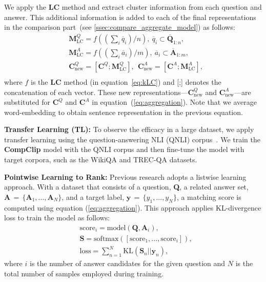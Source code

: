 \documentclass[sigconf]{acmart}
\begin{document}
We apply the \textbf{LC} method and extract cluster information from each question and answer. This additional information is added to each of the final representations in the comparison part~(see \ref{ssec:compare_aggregate_model}) as follows:
\begin{equation}
\begin{aligned}
& \textbf{M}_{\text{LC}}^Q=f(({\scriptstyle\sum_i}\overline{q}_i)/n),~\overline{q}_i\subset{\overline{\textbf{Q}}_{1:n}}, \\
& \textbf{M}_{\text{LC}}^A=f(({\scriptstyle\sum_i}\overline{a}_i)/m),~\overline{a}_i\subset{\overline{\textbf{A}}_{1:m}}, \\
& \textbf{C}^Q_{\text{new}}= [\textbf{C}^Q;\textbf{M}_{\text{LC}}^Q],~~\textbf{C}^A_{\text{new}}= [\textbf{C}^A;\textbf{M}_{\text{LC}}^A], \\
\end{aligned}
\label{eq:lc}
\end{equation}
where $f$ is the \textbf{LC} method (in equation~\ref{eq:kLC}) and [;] denotes the concatenation of each vector.
These new representations—$\textbf{C}^Q_{\text{new}}$ and $\textbf{C}^A_{\text{new}}$—are substituted for $\textbf{C}^Q$ and $\textbf{C}^A$ in equation~(\ref{eq:aggregation}).
Note that we average word-embedding to obtain sentence representation in the previous equation.


\vspace*{2mm}
\noindent\textbf{Transfer Learning (TL): }
To observe the efficacy in a large dataset, we apply transfer learning using the question-answering NLI (QNLI) corpus~\cite{wang2018glue}.
We train the \textbf{CompClip} model with the QNLI corpus and then fine-tune the model with target corpora, such as the WikiQA and TREC-QA datasets.

\vspace*{2mm}
\noindent\textbf{Pointwise Learning to Rank: }
Previous research adopts a listwise learning approach.
With a dataset that consists of a question, \textbf{Q}, a related answer set, $\textbf{A}\,{=}\,\{\textbf{A}_1, ..., \textbf{A}_N\}$, and a target label, $\textbf{y}\,{=}\,\{y_1, ..., y_N\}$, a matching score is computed using equation (\ref{eq:aggregation}).
This approach applies KL-divergence loss to train the model as follows:
\begin{equation}
\begin{aligned}
& \text{score}_i = \text{model}(\textbf{Q}, \textbf{A}_i), \\
& \textbf{S}=\text{softmax}([\text{score}_1, ..., \text{score}_i]), \\
& \text{loss} = {\scriptstyle\sum_{n=1}^{N}}\text{KL}(\textbf{S}_n||\textbf{y}_n),
\end{aligned}
\label{eq:pointw-wise-learning-to-rank}
\end{equation}
where $i$ is the number of answer candidates for the given question and $N$ is the total number of samples employed during training.
\end{document}
